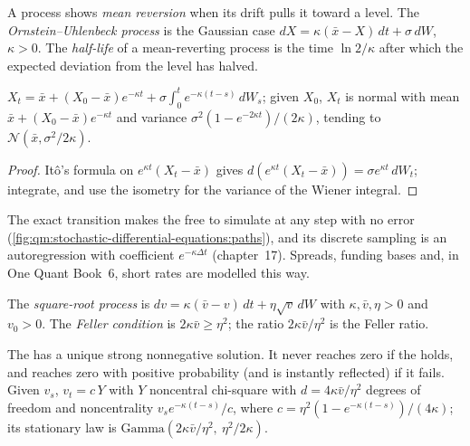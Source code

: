 \begin{definition}\label{def:qm:stochastic-differential-equations:ou}
A process shows \emph{mean reversion} when its drift pulls it toward a level.
The \emph{Ornstein--Uhlenbeck process} is the Gaussian case
$dX = \kappa(\bar x - X)\,dt + \sigma\,dW$, $\kappa > 0$. The \emph{half-life} of a
mean-reverting process is the time $\ln 2/\kappa$ after which the expected deviation from the
level has halved.
\end{definition}

\begin{proposition}\label{prop:qm:stochastic-differential-equations:ou}
$X_t = \bar x + (X_0 - \bar x)e^{-\kappa t} + \sigma\int_0^te^{-\kappa(t-s)}\,dW_s$; given $X_0$, $X_t$ is
normal with mean $\bar x + (X_0 - \bar x)e^{-\kappa t}$ and variance $\sigma^2(1 - e^{-2\kappa t})/(2\kappa)$,
tending to $\mathcal N(\bar x, \sigma^2/2\kappa)$.
\end{proposition}

\begin{proof}
Itô's formula on $e^{\kappa t}(X_t - \bar x)$ gives $d(e^{\kappa t}(X_t - \bar x)) = \sigma e^{\kappa t}\,dW_t$;
integrate, and use the isometry for the variance of the Wiener integral.
\end{proof}

The exact transition makes the  free to simulate at any step with
no error (\cref{fig:qm:stochastic-differential-equations:paths}), and its discrete sampling
is an autoregression with coefficient $e^{-\kappa\Delta t}$ (chapter~17). Spreads, funding
bases and, in One Quant Book~6, short rates are modelled this way.

\begin{definition}\label{def:qm:stochastic-differential-equations:sqrt}
The \emph{square-root process} is $dv = \kappa(\bar v - v)\,dt + \eta\sqrt
v\,dW$ with $\kappa, \bar v, \eta > 0$ and $v_0 > 0$. The \emph{Feller condition} is $2\kappa\bar v \ge \eta^2$; the ratio $2\kappa\bar v/\eta^2$ is the Feller ratio.
\end{definition}

\begin{theorem}[Feller]\label{thm:qm:stochastic-differential-equations:feller}
The  has a unique strong nonnegative solution. It never reaches zero if the
 holds, and reaches zero with positive probability (and is instantly reflected)
if it fails. Given $v_s$, $v_t = c\,Y$ with $Y$ noncentral chi-square with $d = 4\kappa\bar
v/\eta^2$ degrees of freedom and noncentrality $v_se^{-\kappa(t-s)}/c$, where $c = \eta^2(1 -
e^{-\kappa(t-s)})/(4\kappa)$; its stationary law is $\mathrm{Gamma}(2\kappa\bar v/\eta^2,\ \eta^2/2\kappa)$.
\end{theorem}

